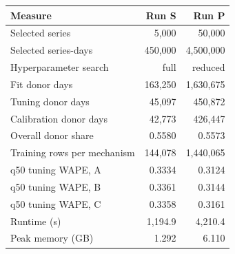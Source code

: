 \begin{tabular}{@{}lrr@{}}
\toprule
Measure & Run S & Run P \\
\midrule
Selected series & 5,000 & 50,000 \\
Selected series-days & 450,000 & 4,500,000 \\
Hyperparameter search & full & reduced \\
Fit donor days & 163,250 & 1,630,675 \\
Tuning donor days & 45,097 & 450,872 \\
Calibration donor days & 42,773 & 426,447 \\
Overall donor share & 0.5580 & 0.5573 \\
Training rows per mechanism & 144,078 & 1,440,065 \\
q50 tuning WAPE, A & 0.3334 & 0.3124 \\
q50 tuning WAPE, B & 0.3361 & 0.3144 \\
q50 tuning WAPE, C & 0.3358 & 0.3161 \\
Runtime (s) & 1,194.9 & 4,210.4 \\
Peak memory (GB) & 1.292 & 6.110 \\
\bottomrule
\end{tabular}
